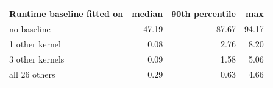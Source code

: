 \begin{tabular}{lrrr}
\toprule
Runtime baseline fitted on & median & 90th percentile & max \\
\midrule
no baseline & 47.19 & 87.67 & 94.17 \\
1 other kernel & 0.08 & 2.76 & 8.20 \\
3 other kernels & 0.09 & 1.58 & 5.06 \\
all 26 others & 0.29 & 0.63 & 4.66 \\
\bottomrule
\end{tabular}

